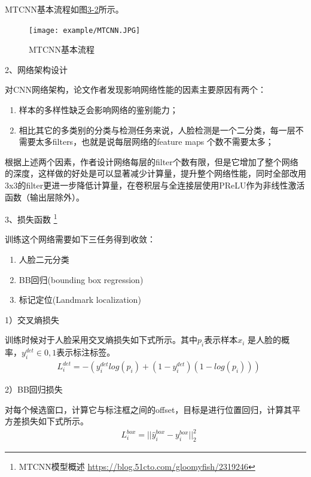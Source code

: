MTCNN基本流程如图\href{figure:3-2}{3-2}所示。

\begin{figure}[!htp]

\centering
\texttt{[image: example/MTCNN.JPG]}
\caption{MTCNN基本流程}
\label{figure:3-2}

\end{figure}

2、网络架构设计

对CNN网络架构，论文作者发现影响网络性能的因素主要原因有两个：
\begin{enumerate}[label=\circled{\arabic*}]
    \item 样本的多样性缺乏会影响网络的鉴别能力；
    \item 相比其它的多类别的分类与检测任务来说，人脸检测是一个二分类，每一层不需要太多filters，也就是说每层网络的feature maps 个数不需要太多；
\end{enumerate}
根据上述两个因素，作者设计网络每层的filter个数有限，但是它增加了整个网络的深度，这样做的好处是可以显著减少计算量，提升整个网络性能，同时全部改用3x3的filter更进一步降低计算量，在卷积层与全连接层使用PReLU作为非线性激活函数（输出层除外）。

3、损失函数 \footnote{MTCNN模型概述 \quad \url{https://blog.51cto.com/gloomyfish/2319246}}

训练这个网络需要如下三任务得到收敛：
\begin{enumerate}[label=\circled{\arabic*}]
    \item 人脸二元分类
    \item BB回归(bounding box regression)
    \item 标记定位(Landmark localization)
\end{enumerate}

1）交叉熵损失

训练时候对于人脸采用交叉熵损失如下式所示。其中$p_i$表示样本$x_i$ 是人脸的概率，$y_i^{det} \in {0,1}$表示标注标签。
\begin{align}
& L_i^{det} = -(y_i^{det} log(p_i) + (1 - y_i^{det})(1 - log(p_i)))
\end{align}

2）BB回归损失

对每个候选窗口，计算它与标注框之间的offset，目标是进行位置回归，计算其平方差损失如下式所示。
\begin{align}
& L_i^{box} = ||\hat{y}_i^{box} - y_i^{box}||_2^2
\end{align}

